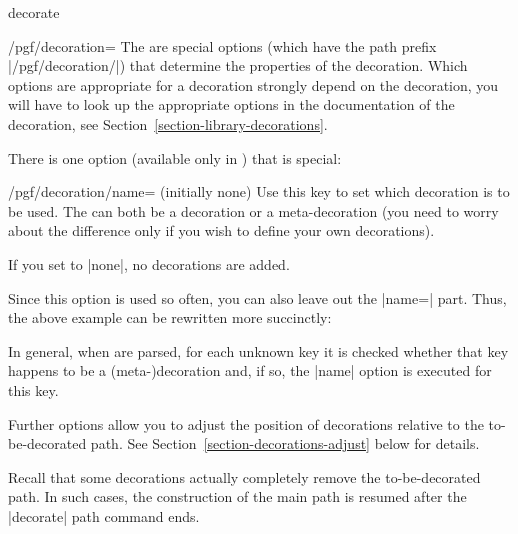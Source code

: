 \begin{pathoperation}{decorate}{}
\begin{key}{/pgf/decoration=}
    The  are special options
    (which have the path prefix |/pgf/decoration/|) that determine the
    properties of the decoration. Which options are appropriate for a
    decoration strongly depend on the decoration, you will have to look
    up the appropriate options in the documentation of the decoration,
    see Section~\ref{section-library-decorations}.

    There is one option (available only in \tikzname) that is special:
    \begin{key}{/pgf/decoration/name= (initially none)}
      Use this key to set which decoration is to be used. The
       can both be a decoration or a meta-decoration (you
      need to worry about the difference only if you wish to define
      your own decorations).

      If you set  to |none|, no decorations are added.
\begin{codeexample}[]
\end{codeexample}
      Since this option is used so often, you can also leave out the
      |name=| part. Thus, the above example can be rewritten more
      succinctly:
\begin{codeexample}[]
\end{codeexample}
      In general, when  are parsed, for each
      unknown key it is checked whether that key happens to be a
      (meta-)decoration and, if so, the |name| option is executed for
      this key.
    \end{key}

    Further options allow you to adjust the position of decorations
    relative to the to-be-decorated path. See
    Section~\ref{section-decorations-adjust} below for details.
  \end{key}

  Recall that some decorations actually completely remove the
  to-be-decorated path. In such cases, the construction of the main
  path is resumed after the |decorate| path command ends.


\end{pathoperation}
